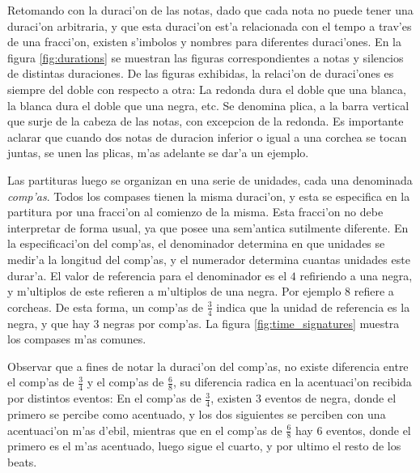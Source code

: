 Retomando con la duraci'on de las notas, dado que cada nota no puede tener una duraci'on arbitraria, y que esta duraci'on est'a relacionada con el tempo
a trav'es de una fracci'on, existen s'imbolos y nombres para diferentes duraci'ones. 
En la figura \ref{fig:durations} se muestran las figuras correspondientes a notas y silencios de distintas duraciones. De las figuras exhibidas, la relaci'on de duraci'ones
es siempre del doble con respecto a otra: La redonda dura el doble que una blanca, la blanca dura el doble que una negra, etc. 
Se denomina plica, a la barra vertical que surje 
de la cabeza de las notas, con excepcion de la redonda. Es importante aclarar que cuando dos notas de duracion inferior o igual a una corchea se tocan juntas, 
se unen las plicas, m'as adelante se dar'a un ejemplo.

\begin{imagen}
    \width{10cm}
\end{imagen}

Las partituras luego se organizan en una serie de unidades, cada una denominada \emph{comp'as}. Todos los compases tienen la misma duraci'on, y esta se especifica
en la partitura por una fracci'on al comienzo de la misma. Esta fracci'on no debe interpretar de forma usual, ya que posee una sem'antica sutilmente diferente.
En la especificaci'on del comp'as, el denominador determina en que unidades se medir'a la longitud del comp'as, y el numerador determina cuantas unidades 
este durar'a. El valor de referencia para el denominador es el $4$ refiriendo a una negra, y m'ultiplos de este refieren a m'ultiplos de una negra. Por ejemplo
$8$ refiere a corcheas.  De esta forma, un comp'as de $\frac{3}{4}$ indica que la unidad de referencia es la negra, y que hay $3$ negras por comp'as.
La figura \ref{fig:time_signatures} muestra los compases m'as comunes. 

\begin{imagen}
    \width{5cm}
\end{imagen}

Observar que a fines de notar la duraci'on del comp'as, no existe diferencia entre el comp'as de $\frac{3}{4}$ y el comp'as de $\frac{6}{8}$, su diferencia
radica en la acentuaci'on recibida por distintos eventos: En el comp'as de $\frac{3}{4}$, existen 3 eventos de negra, donde el primero se percibe como acentuado, 
y los dos siguientes se perciben con una acentuaci'on m'as d'ebil, mientras que en el comp'as de $\frac{6}{8}$ hay 6 eventos, donde el primero es el m'as 
acentuado, luego sigue el cuarto, y por ultimo el resto de los beats.

